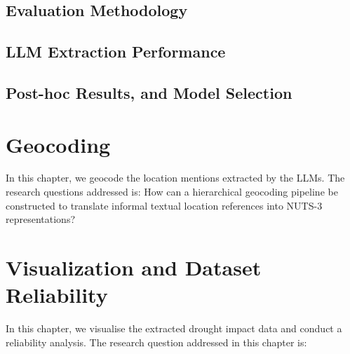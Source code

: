 \documentclass[11pt, a4paper, oneside]{book}
\begin{document}
\label{ch:extraction_performance}


\section{Evaluation Methodology}




% 


\section{LLM Extraction Performance}


\section{Post-hoc Results, and Model Selection}
\label{ch:Post-hoc Results}




\chapter{Geocoding}

In this chapter, we geocode the location mentions extracted by the LLMs. The research questions addressed is:
How can a hierarchical geocoding pipeline be constructed to translate informal textual location references into NUTS-3 representations?
\label{ch:geocoding}


\label{ch:geocoding_pipe}

\newpage
\chapter{Visualization and Dataset Reliability}
In this chapter, we visualise the extracted drought impact data and conduct a reliability analysis. The research question addressed in this chapter is:
\end{document}
